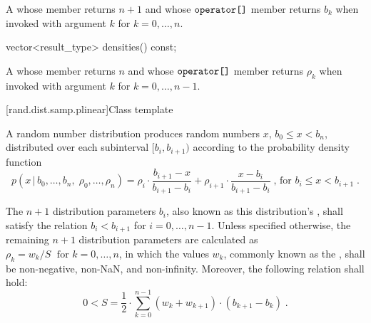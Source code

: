 \begin{itemdescr}
\pnum\returns A 
 whose  member returns $n + 1$
 and whose $ \texttt{\protect operator[]} $ member returns $b_k$
 when invoked with argument $k$ for $k = 0, \ldots, n $.
\end{itemdescr}

%
\begin{itemdecl}
vector<result_type> densities() const;
\end{itemdecl}

\begin{itemdescr}
\pnum\returns A 
 whose  member returns $n$
 and whose $ \texttt{\protect operator[]} $ member returns $\rho_k$
 when invoked with argument $k$ for $k = 0, \ldots, n\!-\!1 $.
\end{itemdescr}



[rand.dist.samp.plinear]{Class template }%
%
%

\pnum
A  random number distribution
produces random numbers $x$,
$ b_0 \leq x < b_n $,
distributed over each subinterval
$ [ b_i, b_{i+1} ) $
according to the probability density function
%
%
\[%
 p(x\,|\,b_0,\ldots,b_n,\;\rho_0,\ldots,\rho_n)
      = \rho_i     \cdot {\frac{b_{i+1} - x}{b_{i+1} - b_i}}
      + \rho_{i+1} \cdot {\frac{x - b_i}{b_{i+1} - b_i}}
\; \mbox{,}
\mbox{ for } b_i \le x < b_{i+1}
\; \mbox{.}
\]

\pnum
The $n+1$ distribution parameters $b_i$,
also known as this distribution's %
%
%
, shall satisfy the relation
 $ b_i < b_{i+1} $
for $i = 0, \ldots, n\!-\!1 $.
Unless specified otherwise,
the remaining $n+1$ distribution parameters are calculated as
$ \rho_k = {w_k / S} \; \mbox{ for } k = 0, \ldots, n $,
in which the values $w_k$,
commonly known as the %
%
%
, shall be non-negative, non-NaN, and non-infinity.
Moreover, the following relation shall hold:
\[%
 0 < S = \frac{1}{2}
       \cdot \sum_{k=0}^{n-1} (w_k + w_{k+1}) \cdot (b_{k+1} - b_k)
\; \mbox{.}
\]

